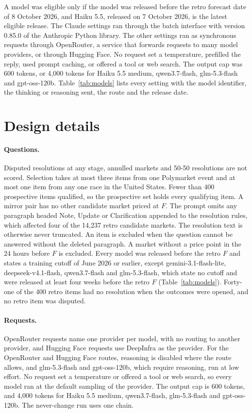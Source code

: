 \documentclass[11pt]{article}
\begin{document}
A model was eligible only if the model was released before the retro forecast date of 8 October 2026, and Haiku 5.5, released on 7 October 2026, is the latest eligible release. The Claude settings ran through the batch interface with version 0.85.0 of the Anthropic Python library. The other settings ran as synchronous requests through OpenRouter, a service that forwards requests to many model providers, or through Hugging Face. No request set a temperature, prefilled the reply, used prompt caching, or offered a tool or web search. The output cap was 600 tokens, or 4,000 tokens for Haiku 5.5 medium, qwen3.7-flash, glm-5.3-flash and gpt-oss-120b. Table~\ref{tab:models} lists every setting with the model identifier, the thinking or reasoning sent, the route and the release date.



\section{Design details}
\label{app:design}

\paragraph{Questions.}
Disputed resolutions at any stage, annulled markets and 50-50 resolutions are not scored. Selection takes at most three items from one Polymarket event and at most one item from any one race in the United States. Fewer than 400 prospective items qualified, so the prospective set holds every qualifying item. A mirror pair has no other candidate market priced at $F$. The prompt omits any paragraph headed Note, Update or Clarification appended to the resolution rules, which affected four of the 14,237 retro candidate markets. The resolution text is otherwise never truncated. An item is excluded when the question cannot be answered without the deleted paragraph. A market without a price point in the 24 hours before $F$ is excluded. Every model was released before the retro $F$ and states a training cutoff of June 2026 or earlier, except gemini-3.1-flash-lite, deepseek-v4.1-flash, qwen3.7-flash and glm-5.3-flash, which state no cutoff and were released at least four weeks before the retro $F$ (Table~\ref{tab:models}). Forty-one of the 400 retro items had no resolution when the outcomes were opened, and no retro item was disputed.

\paragraph{Requests.}
OpenRouter requests name one provider per model, with no routing to another provider, and Hugging Face requests use DeepInfra as the provider. For the OpenRouter and Hugging Face routes, reasoning is disabled where the route allows, and glm-5.3-flash and gpt-oss-120b, which require reasoning, run at low effort. No request set a temperature or offered a tool or web search, so every model ran at the default sampling of the provider. The output cap is 600 tokens, and 4,000 tokens for Haiku 5.5 medium, qwen3.7-flash, glm-5.3-flash and gpt-oss-120b. The never-change run uses one chain.
\end{document}
